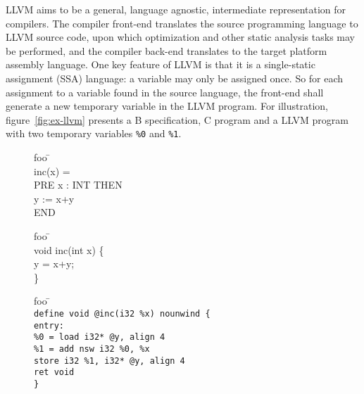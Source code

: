 \documentclass{llncs}
\newcommand{\llvm}[1]{\texttt{#1}}
\newcommand{\B}[1]{\textsf{#1}}
\begin{document}
LLVM aims to be a general, language agnostic, intermediate representation for
compilers. The compiler front-end translates the source programming language to
LLVM source code, upon which optimization and other static analysis tasks may
be performed, and the compiler back-end translates to the target platform
assembly language. One key feature of LLVM is that it is a single-static
assignment (SSA) language: a variable may only be assigned once. So for each
assignment to a variable found in the source language, the front-end shall
generate a new temporary variable in the LLVM program. For illustration,
figure~\ref{fig:ex-llvm} presents a B specification, C program and a LLVM
program with two temporary variables \llvm{\%0} and \llvm{\%1}.
\begin{figure}
\vspace*{-2.3em}
  \begin{minipage}[t]{.3\textwidth}
    \begin{tabbing}
      foo \= \kill  \\
      inc(x) =\\
      \B{PRE} x : INT \B{THEN}   \\
      \> 	y := x+y\\
      \B{END} \\
      \end{tabbing}
  \end{minipage}
  \:\vline\:
  \begin{minipage}[t]{.2\textwidth}
    \begin{tabbing}
      foo \= \kill  \\
      void inc(int x) \{\\
      \> 	y = x+y; \\
      \}\end{tabbing}
  \end{minipage}
	  \:\vline\:
  \begin{minipage}[t]{.6\textwidth}
    \begin{tabbing}
      foo \= \kill  \\
      \llvm{define void @inc(i32 \%x) nounwind \{} \\
      \llvm{entry:}                      \\
      \> \llvm{\%0 = load i32* @y, align 4}     \\
      \> \llvm{\%1 = add nsw i32 \%0, \%x}     \\
      \> \llvm{store i32 \%1, i32* @y, align 4} \\
      \> \llvm{ret void} \\
      \llvm{\}}
    \end{tabbing}


\end{minipage}
\end{figure}
\end{document}
